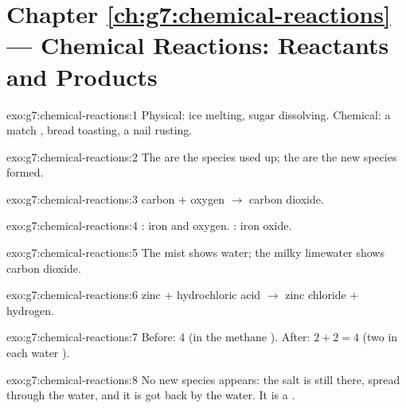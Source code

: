 \section*{Chapter \ref{ch:g7:chemical-reactions} --- Chemical Reactions: Reactants and Products}

\begin{solution}{exo:g7:chemical-reactions:1}
Physical: ice melting, sugar dissolving. Chemical: a match ,
bread toasting, a nail rusting.
\end{solution}

\begin{solution}{exo:g7:chemical-reactions:2}
The  are the species used up; the  are the new species
formed.
\end{solution}

\begin{solution}{exo:g7:chemical-reactions:3}
carbon $+$ oxygen $\longrightarrow$ carbon dioxide.
\end{solution}

\begin{solution}{exo:g7:chemical-reactions:4}
: iron and oxygen. : iron oxide.
\end{solution}

\begin{solution}{exo:g7:chemical-reactions:5}
The mist shows water; the milky limewater shows carbon dioxide.
\end{solution}

\begin{solution}{exo:g7:chemical-reactions:6}
zinc $+$ hydrochloric acid $\longrightarrow$ zinc chloride $+$ hydrogen.
\end{solution}

\begin{solution}{exo:g7:chemical-reactions:7}
Before: 4 (in the methane ). After: $2 + 2 = 4$ (two in each
water ).
\end{solution}

\begin{solution}{exo:g7:chemical-reactions:8}
No new species appears: the salt is still there, spread through the
water, and it is got back by  the water. It is a .
\end{solution}

